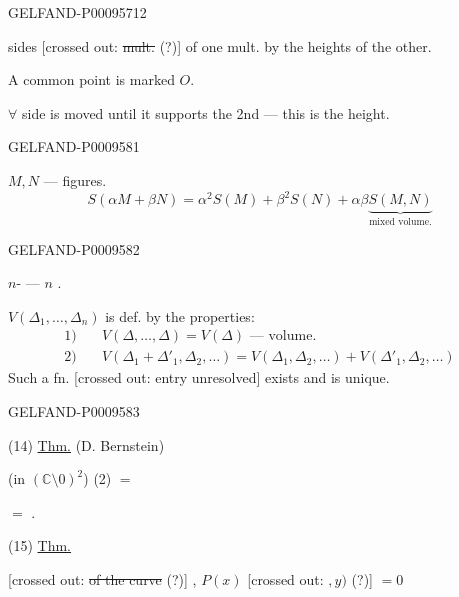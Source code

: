 \begin{GelfandAdjacentEvidence}{GELFAND-P000957}{12}


sides [crossed out: \sout{mult.} (?)] of one mult. by the heights of the other.
\end{GelfandAdjacentEvidence}


A common point is marked $O$.

$\forall$ side is moved until it supports the 2nd --- this is the height.

\begin{GelfandAdjacentEvidence}{GELFAND-P000958}{1}


$M,N$ --- figures.
\[
 S(\alpha M+\beta N)=\alpha^2S(M)+\beta^2S(N)+
 \alpha\beta\underbrace{S(M,N)}_{\text{mixed volume.}}
\]
\end{GelfandAdjacentEvidence}
\begin{GelfandAdjacentEvidence}{GELFAND-P000958}{2}


 $n$- ---  $n$ .

$V(\Delta_1,\ldots,\Delta_n)$ is def. by the properties:
\begin{align*}
 1)\quad &V(\Delta,\ldots,\Delta)=V(\Delta)\text{ --- volume.}\\
 2)\quad &V(\Delta_1+\Delta'_1,\Delta_2,\ldots)
  =V(\Delta_1,\Delta_2,\ldots)+V(\Delta'_1,\Delta_2,\ldots)
\end{align*}
Such a fn. [crossed out: entry unresolved] exists and is unique.
\end{GelfandAdjacentEvidence}
\begin{GelfandAdjacentEvidence}{GELFAND-P000958}{3}


(14) \underline{Thm.} (D. Bernstein)

 (in $(\mathbb C\setminus0)^2$)   (2) $=$

$=$ .

(15) \underline{Thm.}

 [crossed out: \sout{of the curve} (?)] ,
$P(x)$ [crossed out: \(,y)\) (?)] \( {}=0 \)
\end{GelfandAdjacentEvidence}
